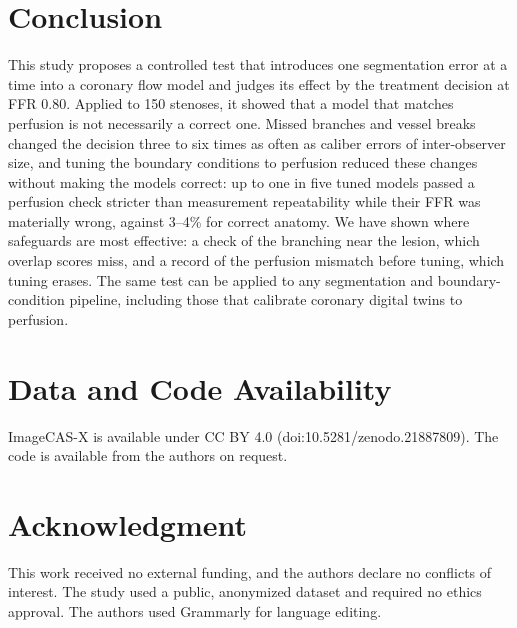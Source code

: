 \documentclass[journal,twoside,web]{ieeecolor}
\begin{document}
\section{Conclusion}
This study proposes a controlled test that introduces one segmentation error at a time into a coronary flow model and judges
its effect by the treatment decision at FFR 0.80. Applied to 150 stenoses, it showed that a model that matches
perfusion is not necessarily a correct one. Missed branches and vessel breaks changed the decision three to six times
as often as caliber errors of inter-observer size, and tuning the boundary conditions to perfusion reduced these
changes without making the models correct: up to one in five tuned models passed a perfusion check stricter than
measurement repeatability while their FFR was materially wrong, against 3--4\% for correct anatomy. We have
shown where safeguards are most effective: a check of the branching near the lesion, which overlap scores miss, and
a record of the perfusion mismatch before tuning, which tuning erases. The same test can be applied to any
segmentation and boundary-condition pipeline, including those that calibrate coronary digital twins to perfusion.

\section*{Data and Code Availability}
ImageCAS-X is available under CC BY 4.0 (doi:10.5281/zenodo.21887809). The code is available from the authors on request.

\section*{Acknowledgment}
This work received no external funding, and the authors declare no conflicts of interest. The study used a public, anonymized dataset and required no ethics
approval. The authors used Grammarly for language editing.



\end{document}
